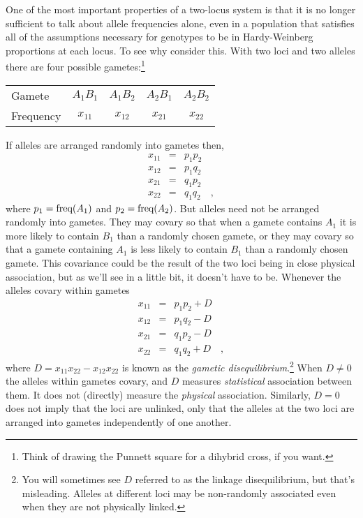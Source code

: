 One of the most important properties of a two-locus system is that it
is no longer sufficient to talk about allele frequencies alone, even
in a population that satisfies all of the assumptions necessary for
genotypes to be in Hardy-Weinberg proportions at each locus. To see
why consider this. With two loci and two alleles there are four
possible gametes:\footnote{Think of drawing the Punnett square for a
  dihybrid cross, if you want.}

\begin{center}
\begin{tabular}{lcccc}
Gamete    & $A_1B_1$ & $A_1B_2$ & $A_2B_1$ & $A_2B_2$ \\
Frequency & $x_{11}$ & $x_{12}$ & $x_{21}$ & $x_{22}$
\end{tabular}
\end{center}

If alleles are arranged randomly into gametes then,
\begin{eqnarray*}
x_{11} &=& p_1p_2 \\
x_{12} &=& p_1q_2 \\
x_{21} &=& q_1p_2 \\
x_{22} &=& q_1q_2 \quad ,
\end{eqnarray*}
where $p_1 = \hbox{freq}(A_1)$ and $p_2 = \hbox{freq}(A_2)$. But
alleles need not be arranged randomly into gametes. They may covary so
that when a gamete contains $A_1$ it is more likely to contain $B_1$
than a randomly chosen gamete, or they may covary so that a gamete
containing $A_1$ is less likely to contain $B_1$ than a randomly
chosen gamete. This covariance could be the result of the two loci
being in close physical association, but as we'll see in a little bit,
it doesn't have to be. Whenever the alleles covary within gametes
\begin{eqnarray*}
x_{11} &=& p_1p_2 + D \\
x_{12} &=& p_1q_2 - D \\
x_{21} &=& q_1p_2 - D \\
x_{22} &=& q_1q_2 + D \quad ,
\end{eqnarray*}
where $D = x_{11}x_{22} - x_{12}x_{22}$ is known as the {\it gametic
  disequilibrium}.\footnote{You will sometimes see $D$ referred to as
  the linkage disequilibrium, but that's misleading. Alleles at
  different loci may be non-randomly associated even when they are not
  physically linked.} When $D \ne 0$ the alleles within gametes
covary, and $D$ measures {\it statistical\/} association between
them. It does not (directly) measure the {\it physical\/}
association. Similarly, $D = 0$ does not imply that the loci are
unlinked, only that the alleles at the two loci are arranged into
gametes independently of one another.

